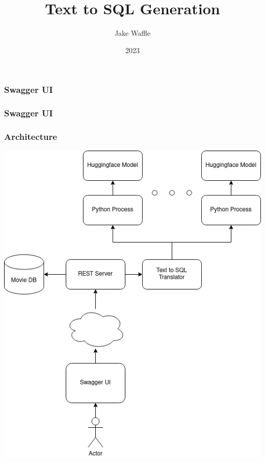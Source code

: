 \documentclass{beamer}
\title{Text to SQL Generation}
\author{Jake Waffle}
\date{2023}
\begin{document}
\frame{\titlepage}

\begin{frame}
\frametitle{Swagger UI}


\end{frame}

\begin{frame}
\frametitle{Swagger UI}


\end{frame}


\begin{frame}
\frametitle{Architecture}

\begin{center}
\includegraphics[scale=0.38]{demo-architecture.drawio.png}
\end{center}

\end{frame}
\end{document}
